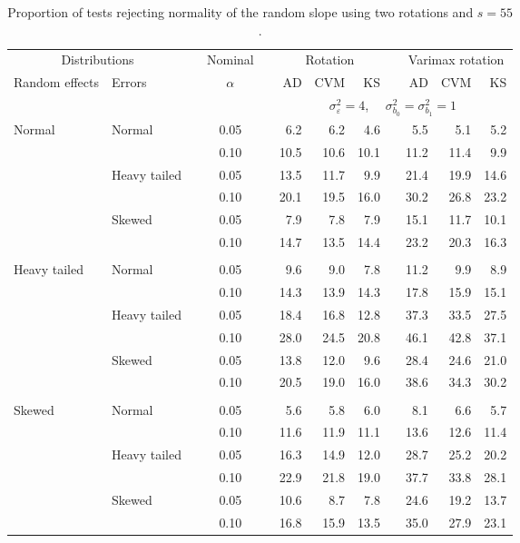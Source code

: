 \begin{table}[ht]
\centering
\caption{\label{tab:fixedsimb155} Proportion of tests rejecting normality of the random slope using two rotations and $s = 55$.}
\begin{scriptsize}
\begin{tabular}{ll p{.1cm} c p{.1cm} rrr p{.1cm} rrr}
  \hline
  \multicolumn{2}{c}{Distributions}& & Nominal & &  \multicolumn{3}{c}{Rotation} & & \multicolumn{3}{c}{Varimax rotation} \\ \cline{1-2} \cline{6-8} \cline{10-12}   
  Random effects & Errors & & $\alpha$ & & AD & CVM & KS & & AD & CVM & KS \\ 
   \hline
& && && \multicolumn{7}{c}{$\sigma_{\varepsilon}^2 = 4$, \ \ $\sigma_{b_0}^2 = \sigma_{b_1}^2 = 1$} \\ \cline{6-12}
\rowcolor{gray!20} Normal & Normal &  & 0.05 &  & 6.2 & 6.2 & 4.6 &  & 5.5 & 5.1 & 5.2 \\ 
\rowcolor{gray!20}    &  &  & 0.10 &  & 10.5 & 10.6 & 10.1 &  & 11.2 & 11.4 & 9.9 \\ 
\rowcolor{gray!20}    & Heavy tailed &  & 0.05 &  & 13.5 & 11.7 & 9.9 &  & 21.4 & 19.9 & 14.6 \\ 
\rowcolor{gray!20}    &  &  & 0.10 &  & 20.1 & 19.5 & 16.0 &  & 30.2 & 26.8 & 23.2 \\ 
\rowcolor{gray!20}    & Skewed &  & 0.05 &  & 7.9 & 7.8 & 7.9 &  & 15.1 & 11.7 & 10.1 \\ 
\rowcolor{gray!20}    &  &  & 0.10 &  & 14.7 & 13.5 & 14.4 &  & 23.2 & 20.3 & 16.3 \\ 
&&&&&&&&&&&\\
  Heavy tailed & Normal &  & 0.05 &  & 9.6 & 9.0 & 7.8 &  & 11.2 & 9.9 & 8.9 \\ 
   &  &  & 0.10 &  & 14.3 & 13.9 & 14.3 &  & 17.8 & 15.9 & 15.1 \\ 
   & Heavy tailed &  & 0.05 &  & 18.4 & 16.8 & 12.8 &  & 37.3 & 33.5 & 27.5 \\ 
   &  &  & 0.10 &  & 28.0 & 24.5 & 20.8 &  & 46.1 & 42.8 & 37.1 \\ 
   & Skewed &  & 0.05 &  & 13.8 & 12.0 & 9.6 &  & 28.4 & 24.6 & 21.0 \\ 
   &  &  & 0.10 &  & 20.5 & 19.0 & 16.0 &  & 38.6 & 34.3 & 30.2 \\ 
&&&&&&&&&&&\\
  Skewed & Normal &  & 0.05 &  & 5.6 & 5.8 & 6.0 &  & 8.1 & 6.6 & 5.7 \\ 
   &  &  & 0.10 &  & 11.6 & 11.9 & 11.1 &  & 13.6 & 12.6 & 11.4 \\ 
   & Heavy tailed &  & 0.05 &  & 16.3 & 14.9 & 12.0 &  & 28.7 & 25.2 & 20.2 \\ 
   &  &  & 0.10 &  & 22.9 & 21.8 & 19.0 &  & 37.7 & 33.8 & 28.1 \\ 
   & Skewed &  & 0.05 &  & 10.6 & 8.7 & 7.8 &  & 24.6 & 19.2 & 13.7 \\ 
   &  &  & 0.10 &  & 16.8 & 15.9 & 13.5 &  & 35.0 & 27.9 & 23.1 \\ 


\end{tabular}
\end{scriptsize}
\end{table}
